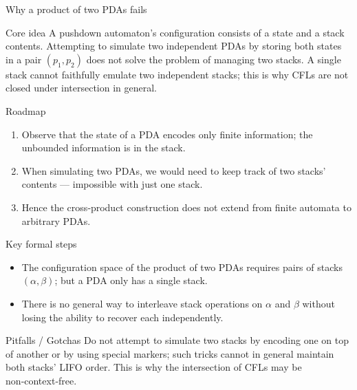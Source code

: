 \begin{frame}[t]{Why a product of two PDAs fails}
  \begin{tblock}{Core idea}
    A pushdown automaton’s configuration consists of a state and a stack
    contents.  Attempting to simulate two independent PDAs by storing
    both states in a pair $(p_1,p_2)$ does not solve the problem of
    managing two stacks.  A single stack cannot faithfully emulate two
    independent stacks; this is why CFLs are not closed under
    intersection in general.
  \end{tblock}
  \begin{tblock}{Roadmap}
    \begin{enumerate}
      \item Observe that the state of a PDA encodes only finite
        information; the unbounded information is in the stack.
      \item When simulating two PDAs, we would need to keep track of
        two stacks’ contents — impossible with just one stack.
      \item Hence the cross‑product construction does not extend from
        finite automata to arbitrary PDAs.
    \end{enumerate}
  \end{tblock}
  \begin{tblock}{Key formal steps}
    \begin{itemize}
      \item The configuration space of the product of two PDAs requires
        pairs of stacks $(\alpha,\beta)$; but a PDA only has a single
        stack.
      \item There is no general way to interleave stack operations on
        $\alpha$ and $\beta$ without losing the ability to recover each
        independently.
    \end{itemize}
  \end{tblock}
  \begin{talert}{Pitfalls / Gotchas}
    Do not attempt to simulate two stacks by encoding one on top of
    another or by using special markers; such tricks cannot in general
    maintain both stacks’ LIFO order.  This is why the intersection of
    CFLs may be non‑context‑free.
  \end{talert}
  \label{fr:6.2-12}
\end{frame}

